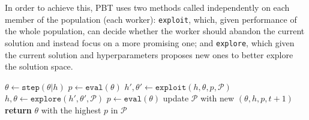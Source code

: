 \documentclass{article} %
\newcommand{\pbtexploit}{\texttt{exploit}\xspace}
\newcommand{\pbtexplore}{\texttt{explore}\xspace}
\begin{document}
In order to achieve this, PBT uses two methods called independently on each member of the population (each worker): \pbtexploit, which, given performance of the whole population, can decide whether the worker should abandon the current solution and instead focus on a more promising one; and \pbtexplore, which given the current solution and hyperparameters proposes new ones to better explore the solution space.


\begin{algorithm}[t]
    \caption{Population Based Training (PBT)}
    \label{pbtalg}
    \begin{algorithmic}[1] %
         
                \State $\theta \gets \mathtt{step}(\theta|h)$ 
                \State $p \gets \mathtt{eval}(\theta)$ 
                \State $h', \theta' \gets \mathtt{exploit}(h,\theta,p,\mathcal{P})$
                \State $h, \theta \gets \mathtt{explore}(h', \theta', \mathcal{P})$ 
                \State $p \gets \mathtt{eval}(\theta)$  
                \EndIf
                \EndIf
            \State update $\mathcal{P}$ with new $(\theta, h, p, t + 1)$ 
            \EndWhile\label{euclidendwhile}
            \EndFor
            \State \textbf{return} $\theta$ with the highest $p$ in $\mathcal{P}$
        \EndProcedure
    \end{algorithmic}
\label{alg:pbt}
\end{algorithm}
\end{document}
